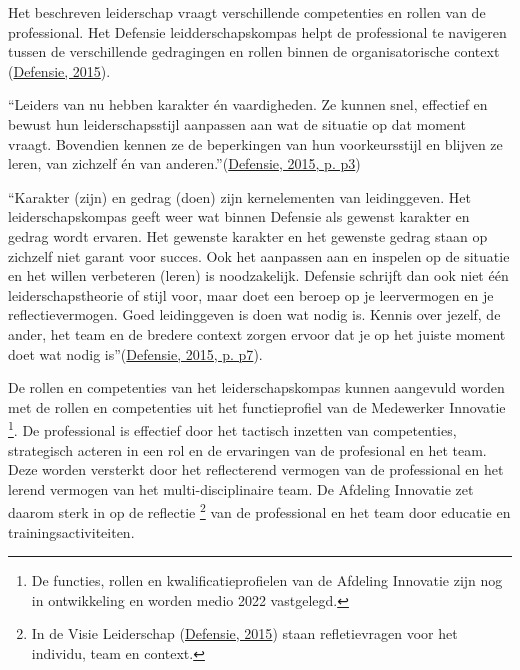 \documentclass[
]{book}
\begin{document}
Het beschreven leiderschap vraagt verschillende competenties en rollen van de professional. Het Defensie leidderschapskompas helpt de professional te navigeren tussen de verschillende gedragingen en rollen binnen de organisatorische context (\protect\hyperlink{ref-ministerie_van_defensie_visie_2015}{Defensie, 2015}).

``Leiders van nu hebben karakter én vaardigheden. Ze kunnen snel, effectief en bewust hun leiderschapsstijl aanpassen aan wat de situatie op dat moment vraagt. Bovendien kennen ze de beperkingen van hun voorkeursstijl en blijven ze leren, van zichzelf én van anderen.''(\protect\hyperlink{ref-ministerie_van_defensie_visie_2015}{Defensie, 2015, p. p3})

``Karakter (zijn) en gedrag (doen) zijn kernelementen van leidinggeven. Het leiderschapskompas geeft weer wat binnen Defensie als gewenst karakter en gedrag wordt ervaren. Het gewenste karakter en het gewenste gedrag staan op zichzelf niet garant voor succes. Ook het aanpassen aan en inspelen op de situatie en het willen verbeteren (leren) is noodzakelijk. Defensie schrijft dan ook niet één leiderschapstheorie of stijl voor, maar doet een beroep op je leervermogen en je reflectievermogen. Goed leidinggeven is doen wat nodig is. Kennis over jezelf, de ander, het team en de bredere context zorgen ervoor dat je op het juiste moment doet wat nodig is''(\protect\hyperlink{ref-ministerie_van_defensie_visie_2015}{Defensie, 2015, p. p7}).

De rollen en competenties van het leiderschapskompas kunnen aangevuld worden met de rollen en competenties uit het functieprofiel van de Medewerker Innovatie \footnote{De functies, rollen en kwalificatieprofielen van de Afdeling Innovatie zijn nog in ontwikkeling en worden medio 2022 vastgelegd.}. De professional is effectief door het tactisch inzetten van competenties, strategisch acteren in een rol en de ervaringen van de profesional en het team. Deze worden versterkt door het reflecterend vermogen van de professional en het lerend vermogen van het multi-disciplinaire team. De Afdeling Innovatie zet daarom sterk in op de reflectie \footnote{In de Visie Leiderschap (\protect\hyperlink{ref-ministerie_van_defensie_visie_2015}{Defensie, 2015}) staan refletievragen voor het individu, team en context.} van de professional en het team door educatie en trainingsactiviteiten.
\end{document}
